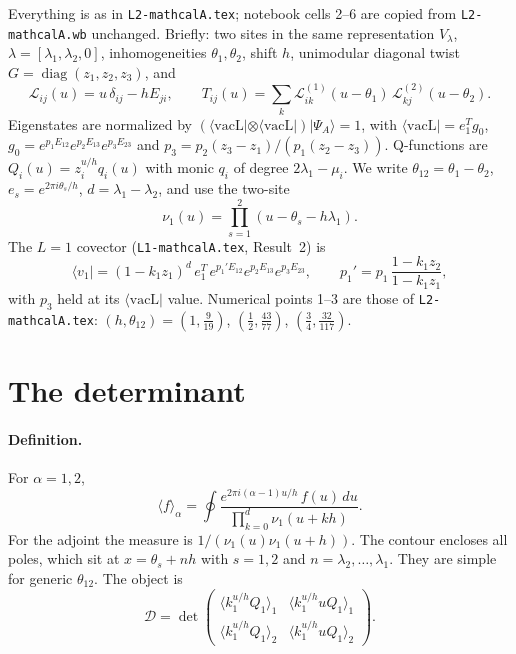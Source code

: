 \documentclass[11pt]{article}
\newcommand{\vacL}{\langle\mathrm{vacL}|}
\newcommand{\nb}[1]{\texttt{#1}}
\theoremstyle{definition}
\theoremstyle{remark}
\begin{document}
Everything is as in \nb{L2-mathcalA.tex}; notebook cells 2--6 are copied from \nb{L2-mathcalA.wb} unchanged. Briefly: two sites in the same representation $V_\lambda$, $\lambda=[\lambda_1,\lambda_2,0]$, inhomogeneities $\theta_1,\theta_2$, shift $h$, unimodular diagonal twist $G=\operatorname{diag}(z_1,z_2,z_3)$, and
\begin{equation}
\mathcal L_{ij}(u)=u\,\delta_{ij}-hE_{ji},\qquad T_{ij}(u)=\sum_k\mathcal L^{(1)}_{ik}(u-\theta_1)\,\mathcal L^{(2)}_{kj}(u-\theta_2).
\end{equation}
Eigenstates are normalized by $(\vacL\otimes\vacL)|\Psi_A\rangle=1$, with $\vacL=e_1^Tg_0$, $g_0=e^{p_1E_{12}}e^{p_2E_{13}}e^{p_3E_{23}}$ and $p_3=p_2(z_3-z_1)/(p_1(z_2-z_3))$. Q-functions are $Q_i(u)=z_i^{u/h}q_i(u)$ with monic $q_i$ of degree $2\lambda_1-\mu_i$. We write $\theta_{12}=\theta_1-\theta_2$, $e_s=e^{2\pi i\theta_s/h}$, $d=\lambda_1-\lambda_2$, and use the two-site
\begin{equation}
\nu_1(u)=\prod_{s=1}^{2}(u-\theta_s-h\lambda_1).
\end{equation}
The $L=1$ covector (\nb{L1-mathcalA.tex}, Result~2) is
\begin{equation}
\langle v_1|=(1-k_1z_1)^{d}\,e_1^T\,e^{p_1'E_{12}}e^{p_2E_{13}}e^{p_3E_{23}},\qquad p_1'=p_1\,\frac{1-k_1z_2}{1-k_1z_1},
\end{equation}
with $p_3$ held at its $\vacL$ value. Numerical points 1--3 are those of \nb{L2-mathcalA.tex}: $(h,\theta_{12})=(1,\tfrac9{19})$, $(\tfrac12,\tfrac{43}{77})$, $(\tfrac34,\tfrac{32}{117})$.

\section{The determinant}\label{sec:det}

\paragraph{Definition.}
For $\alpha=1,2$,
\begin{equation}
\langle f\rangle_\alpha=\oint\frac{e^{2\pi i(\alpha-1)u/h}\,f(u)\,du}{\prod_{k=0}^{d}\nu_1(u+kh)} .
\end{equation}
For the adjoint the measure is $1/(\nu_1(u)\nu_1(u+h))$. The contour encloses all poles, which sit at $x=\theta_s+nh$ with $s=1,2$ and $n=\lambda_2,\dots,\lambda_1$. They are simple for generic $\theta_{12}$. The object is
\begin{equation}
\mathcal D=\det\begin{pmatrix}\langle k_1^{u/h}Q_1\rangle_1&\langle k_1^{u/h}uQ_1\rangle_1\\[2pt]\langle k_1^{u/h}Q_1\rangle_2&\langle k_1^{u/h}uQ_1\rangle_2\end{pmatrix}.
\end{equation}
\end{document}
